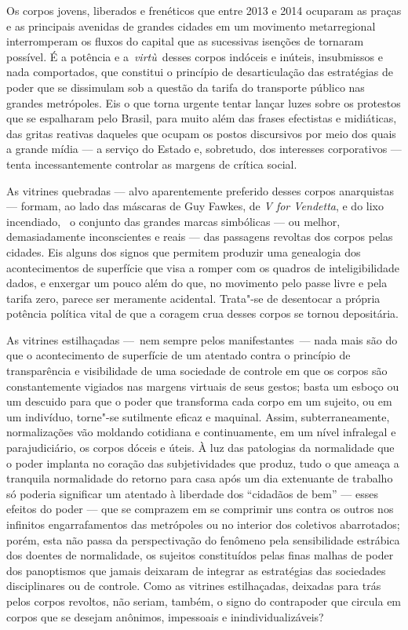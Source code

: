 Os corpos jovens, liberados e frenéticos que entre 2013 e 2014 ocuparam
as praças e as principais avenidas de grandes cidades em um movimento
metarregional interromperam os fluxos do capital que as sucessivas
isenções de  tornaram possível. É a potência e a~\emph{virtù~}desses
corpos indóceis e inúteis, insubmissos e nada comportados, que constitui
o princípio de desarticulação das estratégias de poder que se dissimulam
sob a questão da tarifa do transporte público nas grandes metrópoles.
Eis o que torna urgente tentar lançar luzes sobre os protestos que se
espalharam pelo Brasil, para muito além das frases efectistas e
midiáticas, das gritas reativas daqueles que ocupam os postos
discursivos por meio dos quais a grande mídia --- a serviço do Estado e,
sobretudo, dos interesses corporativos --- tenta incessantemente controlar
as margens de crítica social.

As vitrines quebradas --- alvo aparentemente preferido desses corpos
anarquistas --- formam, ao lado das máscaras de Guy Fawkes, de \emph{V
for Vendetta}, e do lixo incendiado,~ o conjunto das grandes marcas
simbólicas --- ou melhor, demasiadamente inconscientes e reais --- das
passagens revoltas dos corpos pelas cidades. Eis alguns dos signos que
permitem produzir uma genealogia dos acontecimentos de superfície que
visa a romper com os quadros de inteligibilidade dados, e enxergar um
pouco além do que, no movimento pelo passe livre e pela tarifa zero,
parece ser meramente acidental. Trata"-se de desentocar a própria
potência política vital de que a coragem crua desses corpos se tornou
depositária.

As vitrines estilhaçadas ---~nem sempre pelos manifestantes~--- nada mais
são do que o acontecimento de superfície de um atentado contra o
princípio de transparência e visibilidade de uma sociedade de controle
em que os corpos são constantemente vigiados nas margens virtuais de
seus gestos; basta um esboço ou um descuido para que o poder que
transforma cada corpo em um sujeito, ou em um indivíduo, torne"-se
sutilmente eficaz e maquinal. Assim, subterraneamente, normalizações vão
moldando cotidiana e continuamente, em um nível infralegal e
parajudiciário, os corpos dóceis e úteis. À luz das patologias da
normalidade que o poder implanta no coração das subjetividades que
produz, tudo o que ameaça a tranquila normalidade do retorno para casa
após um dia extenuante de trabalho só poderia significar um atentado à
liberdade dos ``cidadãos de bem'' --- esses efeitos do poder --- que se
comprazem em se comprimir uns contra os outros nos infinitos
engarrafamentos das metrópoles ou no interior dos coletivos abarrotados;
porém, esta não passa da perspectivação do fenômeno pela sensibilidade
estrábica dos doentes de normalidade, os sujeitos constituídos pelas
finas malhas de poder dos panoptismos que jamais deixaram de integrar as
estratégias das sociedades disciplinares ou de controle. Como as
vitrines estilhaçadas, deixadas para trás pelos corpos revoltos, não
seriam, também, o signo do contrapoder que circula em corpos que se
desejam anônimos, impessoais e inindividualizáveis?

